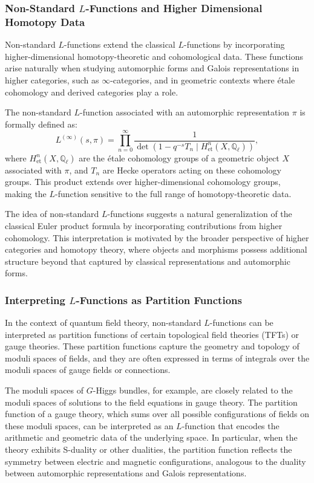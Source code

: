 \documentclass{article}
\theoremstyle{remark}
\begin{document}
\subsubsection{Non-Standard $L$-Functions and Higher Dimensional Homotopy Data}

Non-standard $L$-functions extend the classical $L$-functions by incorporating higher-dimensional homotopy-theoretic and cohomological data. These functions arise naturally when studying automorphic forms and Galois representations in higher categories, such as $\infty$-categories, and in geometric contexts where étale cohomology and derived categories play a role.

The non-standard $L$-function associated with an automorphic representation $\pi$ is formally defined as:
\[
L^{(\infty)}(s, \pi) = \prod_{n=0}^{\infty} \frac{1}{\det(1 - q^{-s} T_n \mid H^n_{\text{et}}(X, \mathbb{Q}_\ell))},
\]
where $H^n_{\text{et}}(X, \mathbb{Q}_\ell)$ are the étale cohomology groups of a geometric object $X$ associated with $\pi$, and $T_n$ are Hecke operators acting on these cohomology groups. This product extends over higher-dimensional cohomology groups, making the $L$-function sensitive to the full range of homotopy-theoretic data.

The idea of non-standard $L$-functions suggests a natural generalization of the classical Euler product formula by incorporating contributions from higher cohomology. This interpretation is motivated by the broader perspective of higher categories and homotopy theory, where objects and morphisms possess additional structure beyond that captured by classical representations and automorphic forms.

\subsubsection{Interpreting $L$-Functions as Partition Functions}

In the context of quantum field theory, non-standard $L$-functions can be interpreted as partition functions of certain topological field theories (TFTs) or gauge theories. These partition functions capture the geometry and topology of moduli spaces of fields, and they are often expressed in terms of integrals over the moduli spaces of gauge fields or connections.

The moduli spaces of $G$-Higgs bundles, for example, are closely related to the moduli spaces of solutions to the field equations in gauge theory. The partition function of a gauge theory, which sums over all possible configurations of fields on these moduli spaces, can be interpreted as an $L$-function that encodes the arithmetic and geometric data of the underlying space. In particular, when the theory exhibits S-duality or other dualities, the partition function reflects the symmetry between electric and magnetic configurations, analogous to the duality between automorphic representations and Galois representations.
\end{document}
